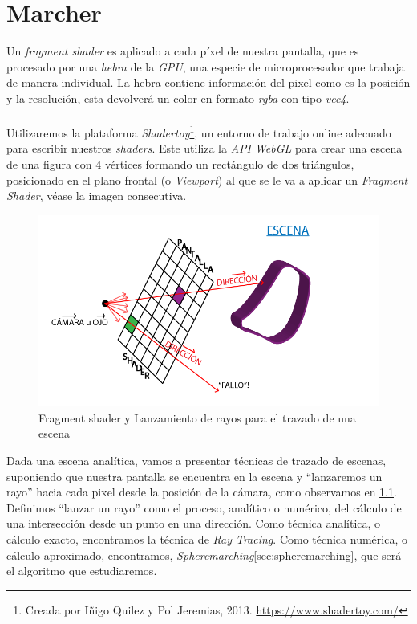 \chapter{Marcher\label{ch:marcher}}
Un \textit{fragment shader} es aplicado a cada píxel de nuestra pantalla, que es procesado por una \textit{hebra} de la \textit{GPU}, una especie de microprocesador que trabaja de manera individual. La hebra contiene información del pixel como es la posición y la resolución, esta devolverá un color en formato \textit{rgba} con tipo \textit{vec4}.\\\\
Utilizaremos la plataforma \textit{Shadertoy}\footnote{Creada por Iñigo Quilez  y Pol Jeremias, 2013. \url{https://www.shadertoy.com/}}, un entorno de trabajo online adecuado para escribir nuestros \textit{shaders}. Este utiliza la \textit{API WebGL} para crear una escena de una figura con 4 vértices formando un rectángulo de dos triángulos, posicionado en el plano frontal (o \textit{Viewport}) al que se le va a aplicar un \textit{Fragment Shader}, véase la imagen consecutiva.

\begin{figure}[H]
  \centering
  \captionsetup{justification=centering}
  \includegraphics[width=1.0\textwidth]{secciones/imagenes/starting/gpu.png}
  \caption{Fragment shader y Lanzamiento de rayos para el trazado de una escena}
  \label{fig:marcher}
\end{figure}

Dada una escena analítica, vamos a presentar técnicas de trazado de escenas, suponiendo que nuestra pantalla se encuentra en la escena y \enquote{lanzaremos un rayo} hacia cada pixel desde la posición de la cámara, como observamos en \ref{fig:marcher}. Definimos \enquote{lanzar un rayo} como el proceso, analítico o numérico, del cálculo de una intersección desde un punto en una dirección. Como técnica analítica, o cálculo exacto, encontramos la técnica de 
\textit{Ray Tracing}\cite{glassner1989introduction}. Como técnica numérica, o cálculo aproximado, encontramos, \textit{Spheremarching}\ref{sec:spheremarching}, que será el algoritmo que estudiaremos.

